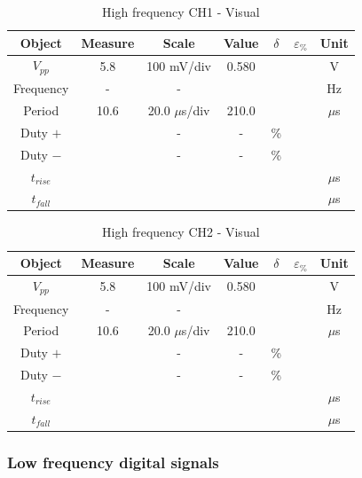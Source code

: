 \documentclass[../main.tex]{subfiles}
\begin{document}
\begin{table}[h!]
\centering	

\begin{tabular}{ccccccc}
\textbf{Object} & \textbf{Measure} & \textbf{Scale}  & \textbf{Value}  & \textbf{$\delta$} & \textbf{$\varepsilon_{\%}$} & \textbf{Unit} \\
\hline
 $V_{pp}$ & 5.8 &  100 mV/div & 0.580 & &  & V \\
 \hline
 Frequency & -  & -  &  &  &  & Hz \\
 \hline
 Period &  10.6 &  20.0 $\mu$s/div &  210.0 &  &   & $\mu$s \\
 \hline 
 Duty $+$ &   & -  & - &  \% \\ 
 \hline
 Duty $-$ &   & -  & - &  \% \\ 
 \hline
 $t_{rise}$ &  &   &   &  &  & $\mu$s \\
 \hline
 $t_{fall}$ &   &  &   &  &  & $\mu$s \\

\end{tabular}
\caption*{High frequency CH1 - Visual}
\end{table}



\begin{table}[h!]
\centering	

\begin{tabular}{ccccccc}
\textbf{Object} & \textbf{Measure} & \textbf{Scale}  & \textbf{Value}  & \textbf{$\delta$} & \textbf{$\varepsilon_{\%}$} & \textbf{Unit} \\
\hline
 $V_{pp}$ & 5.8 &  100 mV/div & 0.580 & &  & V \\
 \hline
 Frequency & -  & -  &  &  &  & Hz \\
 \hline
 Period &  10.6 &  20.0 $\mu$s/div &  210.0 &  &   & $\mu$s \\
 \hline 
 Duty $+$ &   & -  & - &  \% \\ 
 \hline
 Duty $-$ &   & -  & - &  \% \\ 
 \hline
 $t_{rise}$ &  &   &   &  &  & $\mu$s \\
 \hline
 $t_{fall}$ &   &  &   &  &  & $\mu$s \\

\end{tabular}
\caption*{High frequency CH2 - Visual}
\end{table}



\subsubsection*{Low frequency digital signals}
\end{document}
